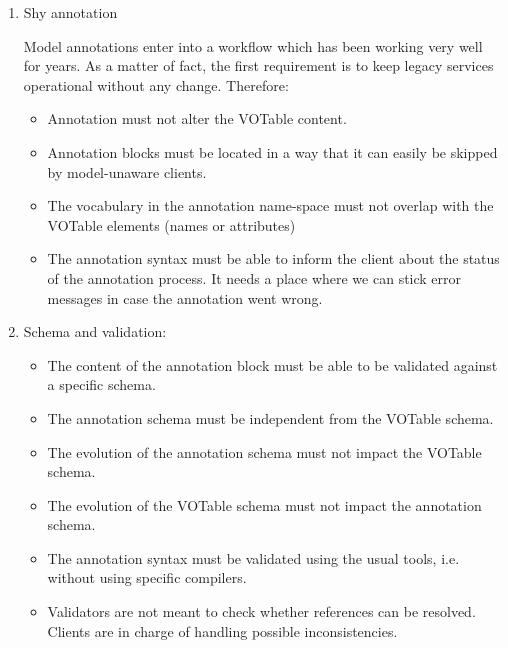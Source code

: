 \begin {enumerate}
  \item Shy annotation 
  
  	Model annotations enter into a workflow which has been working very well for years. As a matter of fact, the first requirement is to keep 
	legacy services operational without any change. Therefore: 
	
  \begin {itemize}
    \item Annotation must not alter the VOTable content.
    \item Annotation blocks must be located in a way that it can easily be skipped by model-unaware clients.
    \item The vocabulary in the annotation name-space must not overlap with the VOTable elements (names or attributes)    
    \item The annotation syntax must be able to inform the client about the status of the annotation process.
          It needs a place where we can stick error messages in case the annotation went wrong.
  \end {itemize}
  
  \item Schema and validation:
  \begin {itemize}
     \item The content of the annotation block must be able to be validated against a specific schema.
    \item The annotation schema must be independent from the VOTable schema.
    \item The evolution of the annotation schema must not impact the VOTable schema.
    \item The evolution of the VOTable schema must not impact the annotation schema.
    \item The annotation syntax must be validated using the usual tools, i.e. without using specific compilers.
    \item Validators are not meant to check whether references can be resolved. Clients are in charge of handling possible inconsistencies.
  \end {itemize}
  

\end{enumerate}
